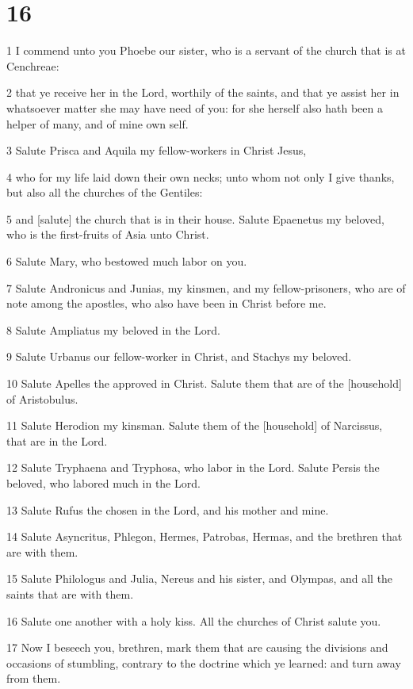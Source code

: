 \chapter{16}

\par 1 I commend unto you Phoebe our sister, who is a servant of the church that is at Cenchreae:
\par 2 that ye receive her in the Lord, worthily of the saints, and that ye assist her in whatsoever matter she may have need of you: for she herself also hath been a helper of many, and of mine own self.
\par 3 Salute Prisca and Aquila my fellow-workers in Christ Jesus,
\par 4 who for my life laid down their own necks; unto whom not only I give thanks, but also all the churches of the Gentiles:
\par 5 and [salute] the church that is in their house. Salute Epaenetus my beloved, who is the first-fruits of Asia unto Christ.
\par 6 Salute Mary, who bestowed much labor on you.
\par 7 Salute Andronicus and Junias, my kinsmen, and my fellow-prisoners, who are of note among the apostles, who also have been in Christ before me.
\par 8 Salute Ampliatus my beloved in the Lord.
\par 9 Salute Urbanus our fellow-worker in Christ, and Stachys my beloved.
\par 10 Salute Apelles the approved in Christ. Salute them that are of the [household] of Aristobulus.
\par 11 Salute Herodion my kinsman. Salute them of the [household] of Narcissus, that are in the Lord.
\par 12 Salute Tryphaena and Tryphosa, who labor in the Lord. Salute Persis the beloved, who labored much in the Lord.
\par 13 Salute Rufus the chosen in the Lord, and his mother and mine.
\par 14 Salute Asyncritus, Phlegon, Hermes, Patrobas, Hermas, and the brethren that are with them.
\par 15 Salute Philologus and Julia, Nereus and his sister, and Olympas, and all the saints that are with them.
\par 16 Salute one another with a holy kiss. All the churches of Christ salute you.
\par 17 Now I beseech you, brethren, mark them that are causing the divisions and occasions of stumbling, contrary to the doctrine which ye learned: and turn away from them.
